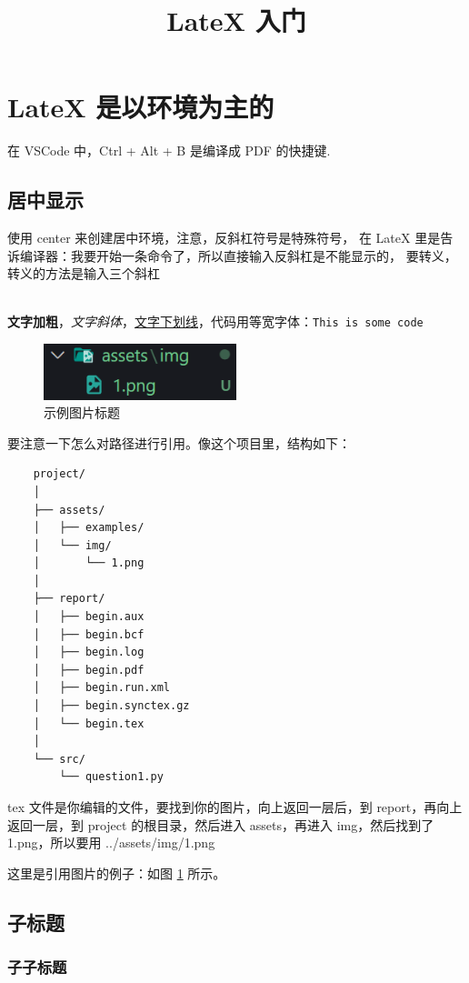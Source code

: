 \documentclass[14pt,a4paper,UTF8,twoside]{article}
\title{LateX 入门}
\begin{document}
\maketitle %

\section{LateX 是以环境为主的}

在 VSCode 中，Ctrl + Alt + B 是编译成 PDF 的快捷键.

\subsection{居中显示}

\begin{center}
    使用 center 来创建居中环境，注意，反斜杠符号是特殊符号，
    在 LateX 里是告诉编译器：我要开始一条命令了，所以直接输入反斜杠是不能显示的，
    要转义，转义的方法是输入三个斜杠 \\\
\end{center}

\textbf{文字加粗}，\textit{文字斜体}，\underline{文字下划线}，代码用等宽字体：\texttt{This is some code}


\begin{figure} [H]
    \centering %
    \includegraphics[width=0.5\textwidth]{../assets/img/1.png} %
    \caption{示例图片标题}
    \label{fig:my_label} %
\end{figure}

要注意一下怎么对路径进行引用。像这个项目里，结构如下：

\begin{lstlisting}
    project/
    │
    ├── assets/
    │   ├── examples/
    │   └── img/
    │       └── 1.png
    │
    ├── report/
    │   ├── begin.aux
    │   ├── begin.bcf
    │   ├── begin.log
    │   ├── begin.pdf
    │   ├── begin.run.xml
    │   ├── begin.synctex.gz
    │   └── begin.tex
    │
    └── src/
        └── question1.py    
\end{lstlisting}

tex 文件是你编辑的文件，要找到你的图片，向上返回一层后，到 report，再向上返回一层，到 project 的根目录，然后进入 assets，再进入 img，然后找到了 1.png，所以要用 ../assets/img/1.png

这里是引用图片的例子：如图 \ref{fig:my_label} 所示。 %

\subsection{子标题}

\subsubsection{子子标题}
\end{document}
